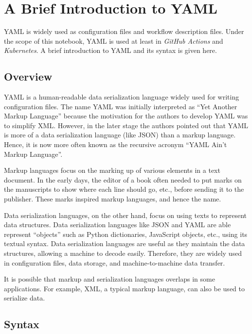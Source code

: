\chapter{A Brief Introduction to YAML} \label{ch:yaml}

YAML is widely used as configuration files and workflow description files. Under the scope of this notebook, YAML is used at least in \textit{GitHub Actions} and \textit{Kubernetes}. A brief introduction to YAML and its syntax is given here.

\section{Overview}

YAML is a human-readable data serialization language widely used for writing configuration files. The name YAML was initially interpreted as ``Yet Another Markup Language'' because the motivation for the authors to develop YAML was to simplify XML. However, in the later stage the authors pointed out that YAML is more of a data serialization language (like JSON) than a markup language. Hence, it is now more often known as the recursive acronym ``YAML Ain't Markup Language''.

\begin{mdframed}

Markup languages focus on the marking up of various elements in a text document. In the early days, the editor of a book often needed to put marks on the manuscripts to show where each line should go, etc., before sending it to the publisher. These marks inspired markup languages, and hence the name.

Data serialization languages, on the other hand, focus on using texts to represent data structures. Data serialization languages like JSON and YAML are able represent ``objects'' such as Python dictionaries, JavaScript objects, etc., using its textual syntax. Data serialization languages are useful as they maintain the data structures, allowing a machine to decode easily. Therefore, they are widely used in configuration files, data storage, and machine-to-machine data transfer.

It is possible that markup and serialization languages overlaps in some applications. For example, XML, a typical markup language, can also be used to serialize data.

\end{mdframed}

\section{Syntax}

